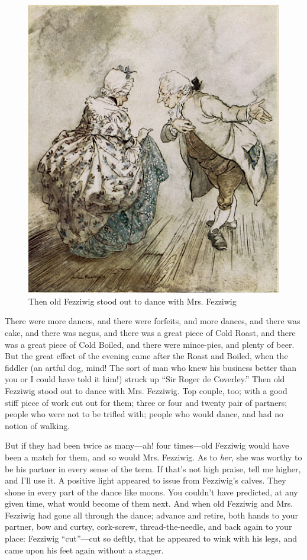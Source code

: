 \documentclass[paper=a5,BCOR=15mm,twoside,DIV=15,headinclude=off,12pt,chapterprefix=off,openany,headings=huge]{scrbook} %
\begin{document}
\begin{figure}[p]
\begin{minipage}[c]{\linewidth}
\includegraphics[width=\linewidth]{fezzidanceimproved}
\caption*{Then old Fezziwig stood out to dance with Mrs. Fezziwig}
\end{minipage}
\end{figure}

There were more dances, and there were forfeits, and more dances, and there was cake, and there was negus, and there was a great piece of Cold Roast, and there was a great piece of Cold Boiled, and there were mince-pies, and plenty of beer. But the great effect of the evening came after the Roast and Boiled, when the fiddler (an artful dog, mind! The sort of man who knew his business better than you or I could have told it him!) struck up \enquote{Sir Roger de Coverley.} Then old Fezziwig stood out to dance with Mrs. Fezziwig. Top couple, too; with a good stiff piece of work cut out for them; three or four and twenty pair of partners; people who were not to be trifled with; people who would dance, and had no notion of walking.

But if they had been twice as many—ah! four times—old Fezziwig would have been a match for them, and so would Mrs. Fezziwig. As to \textit{her}, she was worthy to be his partner in every sense of the term. If that's not high praise, tell me higher, and I'll use it. A positive light appeared to issue from Fezziwig's calves. They shone in every part of the dance like moons. You couldn't have predicted, at any given time, what would become of them next. And when old Fezziwig and Mrs. Fezziwig had gone all through the dance; advance and retire, both hands to your partner, bow and curtsy, cork-screw, thread-the-needle, and back again to your place: Fezziwig \enquote{cut}—cut so deftly, that he appeared to wink with his legs, and came upon his feet again without a stagger.
\end{document}
